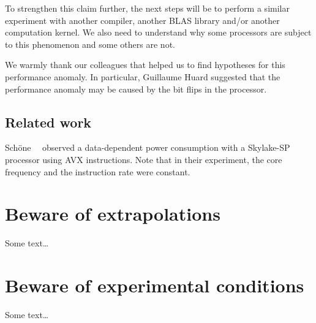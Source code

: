             To strengthen this claim further, the next steps will be to perform a similar experiment with another
            compiler, another BLAS library and/or another computation kernel. We also need to understand why some
            processors are subject to this phenomenon and some others are not.

            We warmly thank our colleagues that helped us to find hypotheses for this performance anomaly. In
            particular, Guillaume Huard suggested that the performance anomaly may be caused by the bit flips in the
            processor.

        \subsection{Related work}%
            Sch{\"{o}}ne~\etal~\cite{DBLP:journals/corr/abs-1905-12468} observed a data-dependent power consumption with
            a Skylake-SP processor using AVX instructions. Note that in their experiment, the core frequency and the
            instruction rate were constant.

    \section{Beware of extrapolations}%
    \label{sec:beware_of_extrapolations}
        Some text\dots

    \section{Beware of experimental conditions}%
    \label{sec:beware_of_experimental_conditions}
        Some text\dots

